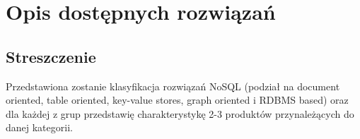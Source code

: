 \chapter{Opis dostępnych rozwiązań}

\section*{Streszczenie}
Przedstawiona zostanie klasyfikacja rozwiązań NoSQL (podział na document oriented, table oriented, key-value stores, graph oriented i RDBMS based) oraz dla każdej z grup przedstawię charakterystykę 2-3 produktów przynależących do danej kategorii.
